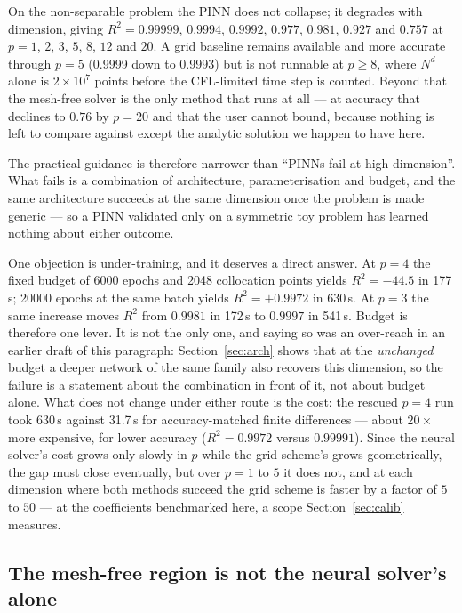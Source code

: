 \documentclass[conference]{IEEEtran}
\begin{document}
On the non-separable problem the PINN does not collapse; it degrades with dimension, giving
$R^2 = 0.99999$, $0.9994$, $0.9992$, $0.977$, $0.981$, $0.927$ and $0.757$ at $p = 1$, $2$, $3$,
$5$, $8$, $12$ and $20$. A grid baseline remains available and more accurate through $p=5$
(0.9999 down to 0.9993) but is not runnable at $p \ge 8$, where $N^d$ alone is $2\times10^7$ points
before the CFL-limited time step is counted. Beyond that the mesh-free solver is the only method
that runs at all --- at accuracy that declines to $0.76$ by $p=20$ and that the user cannot bound,
because nothing is left to compare against except the analytic solution we happen to have here.

The practical guidance is therefore narrower than ``PINNs fail at high dimension''. What fails is a
combination of architecture, parameterisation and budget, and the same architecture succeeds at the
same dimension once the problem is made generic --- so a PINN validated only on a symmetric toy
problem has learned nothing about either outcome.

One objection is under-training, and it deserves a direct answer. At $p=4$ the fixed budget of 6000
epochs and 2048 collocation points yields $R^2 = -44.5$ in 177\,s; 20000 epochs at the same batch
yields $R^2 = +0.9972$ in 630\,s. At $p=3$ the same increase moves $R^2$ from $0.9981$ in 172\,s to
$0.9997$ in 541\,s. Budget is therefore one lever. It is not the only one, and saying so was an
over-reach in an earlier draft of this paragraph: Section~\ref{sec:arch} shows that at the
\emph{unchanged} budget a deeper network of the same family also recovers this dimension, so the
failure is a statement about the combination in front of it, not about budget alone. What does not
change under either route is the cost: the rescued $p=4$ run took 630\,s against 31.7\,s for
accuracy-matched finite differences --- about $20\times$ more expensive, for lower accuracy
($R^2 = 0.9972$ versus $0.99991$). Since the neural solver's cost grows only slowly in $p$ while
the grid scheme's grows geometrically, the gap must close eventually, but over $p = 1$ to $5$ it
does not, and at each dimension where both methods succeed the grid scheme is faster by a factor of
$5$ to $50$ --- at the coefficients benchmarked here, a scope Section~\ref{sec:calib} measures.

\subsection{The mesh-free region is not the neural solver's alone}\label{sec:lsmc}
\end{document}
